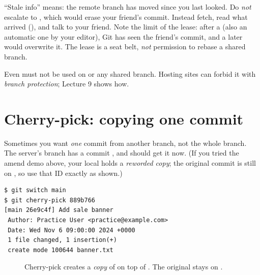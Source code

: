 ``Stale info'' means: the remote branch has moved since you last looked. Do \emph{not} escalate to , which would erase your friend's commit. Instead fetch, read what arrived (), and talk to your friend. Note the limit of the lease: after a  (also an automatic one by your editor), Git has seen the friend's commit, and a later  would overwrite it. The lease is a seat belt, \emph{not} permission to rebase a shared branch.

\begin{pitfall}
Even  must not be used on  or any shared branch. Hosting sites can forbid it with \emph{branch protection}; Lecture 9 shows how.
\end{pitfall}

\section{Cherry-pick: copying one commit}

Sometimes you want \emph{one} commit from another branch, not the whole branch. The server's branch  has a commit , and  should get it now. (If you tried the amend demo above, your local  holds a \emph{reworded copy}; the original commit  is still on , so use that ID exactly as shown.)

\begin{lstlisting}
$ git switch main
$ git cherry-pick 889b766
[main 26e9c4f] Add sale banner
 Author: Practice User <practice@example.com>
 Date: Wed Nov 6 09:00:00 2024 +0000
 1 file changed, 1 insertion(+)
 create mode 100644 banner.txt
\end{lstlisting}

\begin{figure}[H]
\centering
{}
\caption{Cherry-pick creates a \emph{copy} of  on top of . The original stays on .}
\label{fig:cherry}
\end{figure}

